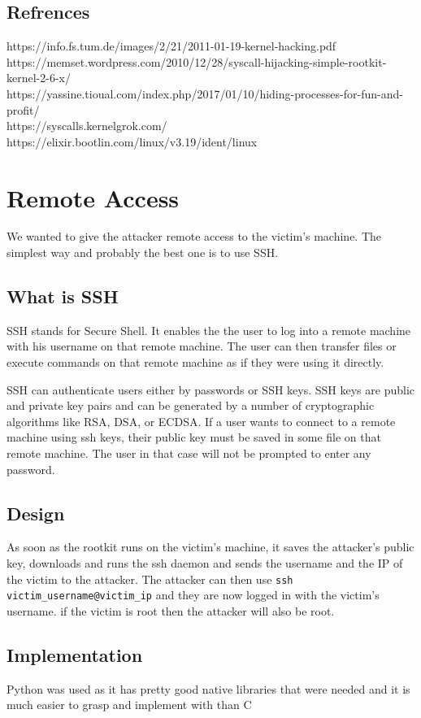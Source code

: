 \documentclass[12pt]{article}
\begin{document}
 	\subsection{Refrences}
 	\small
 	https://info.fs.tum.de/images/2/21/2011-01-19-kernel-hacking.pdf\\
 	https://memset.wordpress.com/2010/12/28/syscall-hijacking-simple-rootkit-kernel-2-6-x/\\
 	https://yassine.tioual.com/index.php/2017/01/10/hiding-processes-for-fun-and-profit/\\
 	https://syscalls.kernelgrok.com/\\
 	https://elixir.bootlin.com/linux/v3.19/ident/linux
 \section{Remote Access}
 We wanted to give the attacker remote access to the victim's machine. The simplest way and probably the best one is to use SSH.
 
 \subsection{What is SSH}
 SSH stands for Secure Shell. It enables the the user to log into a remote machine with his username on that remote machine. The user can then transfer files or execute commands on that remote machine as if they were using it directly. 
 
 SSH can authenticate users either by passwords or SSH keys. SSH keys are public and private key pairs and can be generated by a number of cryptographic algorithms like RSA, DSA, or ECDSA. If a user wants to connect to a remote machine using ssh keys, their public key must be saved in some file on that remote machine. The user in that case will not be prompted to enter any password. 
 
 \subsection{Design}
 As soon as the rootkit runs on the victim's machine, it saves the attacker's public key, downloads and runs the ssh daemon and sends the username and the IP of the victim to the attacker. The attacker can then use \lstinline{ssh victim_username@victim_ip} and they are now logged in with the victim's username. if the victim is root then the attacker will also be root. 
 
 \subsection{Implementation}
 Python was used as it has pretty good native libraries that were needed and it is much easier to grasp and implement with than C
 
\end{document}
